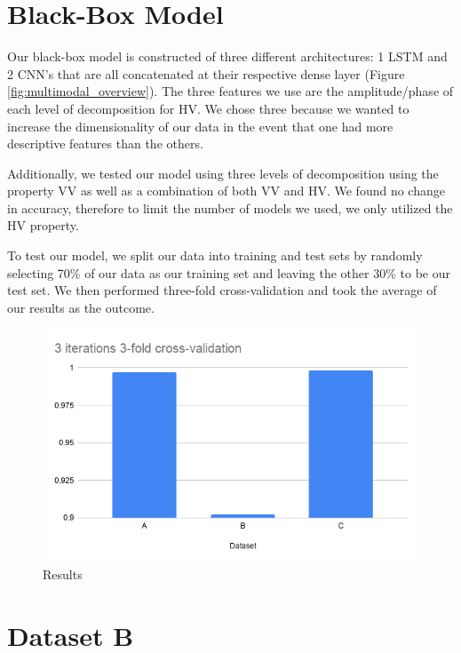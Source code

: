 \documentclass{turabian-thesis}
\begin{document}
\section{Black-Box Model}
Our black-box model is constructed of three different architectures: 1 LSTM and 2 CNN’s that are all concatenated at their respective dense layer (Figure \ref{fig:multimodal_overview}). The three features we use are the amplitude/phase of each level of decomposition for HV. We chose three because we wanted to increase the dimensionality of our data in the event that one had more descriptive features than the others. 

Additionally, we tested our model using three levels of decomposition using the property VV as well as a combination of both VV and HV. We found no change in accuracy, therefore to limit the number of models we used, we only utilized the HV property.


To test our model, we split our data into training and test sets by randomly selecting 70\% of our data as our training set and leaving the other 30\% to be our test set. We then performed three-fold cross-validation and took the average of our results as the outcome.

\begin{figure}[h!]
   \begin{center}
      \includegraphics[scale=0.6]{../media/results.png}
   \end{center}
   \caption{Results}
   \label{fig:final_results}
\end{figure}


\section{Dataset B}
\end{document}
